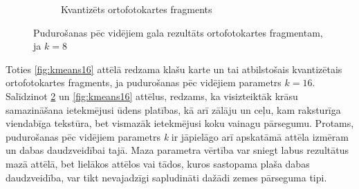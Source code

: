 \documentclass[12pt,paper=a4]{report}
\begin{document}
\begin{figure}[h!]
\begin{subfigure}[b]{.4\linewidth}
\caption{Kvantizēts ortofotokartes fragments}
\label{kmeans8imgq}
\end{subfigure}
\caption{Pudurošanas pēc vidējiem gala rezultāts ortofotokartes fragmentam, ja $k=8$}
\label{fig:kmeans8}
\end{figure}
Toties \ref{fig:kmeans16} attēlā redzama klašu karte un tai atbilstošais kvantizētais ortofotokartes fragments, ja pudurošanas pēc vidējiem parametrs $k=16$. Salīdzinot \ref{fig:kmeans8} un \ref{fig:kmeans16} attēlus, redzams, ka visizteiktāk krāsu samazināšana ietekmējusi ūdens platības, kā arī zālāju un ceļu, kam raksturīga viendabīga tekstūra, bet vismazāk ietekmējusi koku vainagu pārsegumu. Protams, pudurošanas pēc vidējiem parametrs \textit{k} ir jāpielāgo arī apskatāmā attēla izmēram un dabas daudzveidībai tajā. Maza parametra vērtība var sniegt labus rezultātus mazā attēlā, bet lielākos attēlos vai tādos, kuros sastopama plaša dabas daudzveidība, var tikt nevajadzīgi sapludināti dažādi zemes pārseguma tipi.\par
\end{document}
